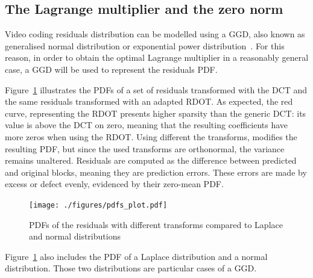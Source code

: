 \documentclass[11pt,a4paper,openright,twoside]{book}
\numberwithin{equation}{section} %
\numberwithin{figure}{section} %
\numberwithin{table}{section} %
\begin{document}
\subsection{The Lagrange multiplier and the zero norm}
\label{sub:the_lagrange_multiplier}

Video coding residuals distribution can be modelled using a \ac{GGD}, also
known as generalised normal distribution or exponential power
distribution~\cite{lam-00-dct-coefficient-distribution,
yovanof-96-analysis-dct-coefficients}.
For this reason, in order to obtain the optimal Lagrange multiplier in a
reasonably general case, a \ac{GGD} will be used to represent the
residuals \ac{PDF}.

Figure~\ref{fig:probability_density_functions} illustrates the \acp{PDF}
of a set of residuals transformed with the \ac{DCT} and the same residuals
transformed with an adapted \ac{RDOT}.
As expected, the red curve, representing the \ac{RDOT} presents higher
sparsity than the generic \ac{DCT}:
its value is above the \ac{DCT} on zero, meaning that the resulting
coefficients have more zeros when using the \ac{RDOT}.
Using different the transforms, modifies the resulting \ac{PDF}, but since the
used transforms are orthonormal, the variance remains unaltered.
Residuals are computed as the difference between predicted and original
blocks, meaning they are prediction errors.
These errors are made by excess or defect evenly, evidenced by their
zero-mean \ac{PDF}.
\begin{figure}[tb]
	\centering
	\texttt{[image: ./figures/pdfs\_plot.pdf]}
	\caption{\acsp{PDF} of the residuals with different transforms
	compared to Laplace and normal distributions}
	\label{fig:probability_density_functions}
\end{figure}
Figure~\ref{fig:probability_density_functions} also includes the
\ac{PDF} of a Laplace distribution and a normal distribution.
Those two distributions are particular cases of a \ac{GGD}.
\end{document}
